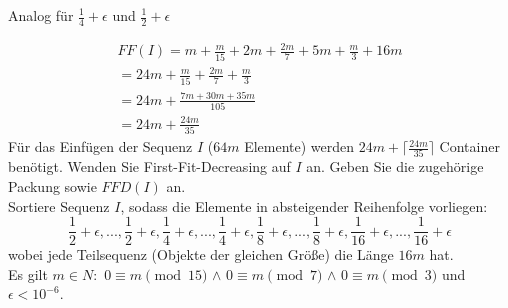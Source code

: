 \documentclass{article}
\begin{document}
Analog für $\frac{1}{4}+\epsilon$ und $\frac{1}{2}+\epsilon$

\begin{align*}
FF(I)=m+\frac{m}{15}+2m+\frac{2m}{7}+5m+\frac{m}{3}+16m\\
=24m+\frac{m}{15}+\frac{2m}{7}+\frac{m}{3}\\
=24m+\frac{7m+30m+35m}{105}\\
=24m+\frac{24m}{35}
\end{align*}
Für das Einfügen der Sequenz $I$ ($64m$ Elemente) werden $24m+\lceil\frac{24m}{35}\rceil$ Container benötigt.
\newpage
Wenden Sie First-Fit-Decreasing auf $I$ an. Geben Sie die zugehörige Packung sowie $FFD(I)$ an.\\
Sortiere Sequenz $I$, sodass die Elemente in absteigender Reihenfolge vorliegen:\\
\begin{equation}
\frac{1}{2}+\epsilon,...,\frac{1}{2}+\epsilon,\frac{1}{4}+\epsilon,...,\frac{1}{4}+\epsilon,\frac{1}{8}+\epsilon,...,\frac{1}{8}+\epsilon,\frac{1}{16}+\epsilon,...,\frac{1}{16}+\epsilon
\end{equation}
wobei jede Teilsequenz (Objekte der gleichen Größe) die Länge $16m $ hat.\\ Es gilt $m\in N: $ $0 \equiv m \pmod{15}$ $\wedge$ $0 \equiv m \pmod{7}$ $\wedge$ $0 \equiv m \pmod{3}$ und $\epsilon < 10^{-6}$.
\end{document}
